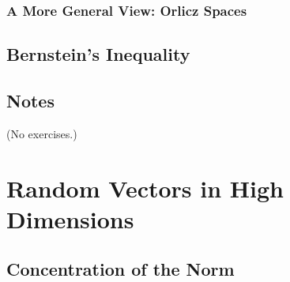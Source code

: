 \documentclass{report}
\theoremstyle{definition}
\newenvironment{exercise}[1]{
  \renewcommand\theexerciseimpl{#1}
  \exerciseimpl
}{\endexerciseimpl}
\begin{document}
\begin{exercise}{2.7.4}
\end{exercise}

\begin{exercise}{2.7.10}
\end{exercise}

\subsection{A More General View: Orlicz Spaces}

\begin{exercise}{2.7.11}
\end{exercise}

\section{Bernstein's Inequality}

\begin{exercise}{2.8.5}
\end{exercise}

\begin{exercise}{2.8.6}
\end{exercise}

\section{Notes}

(No exercises.)


\chapter{Random Vectors in High Dimensions}

\section{Concentration of the Norm}

\begin{exercise}{3.1.4}
\end{exercise}

\begin{exercise}{3.1.5}
\end{exercise}

\begin{exercise}{3.1.6}
\end{exercise}

\begin{exercise}{3.1.7}
\end{exercise}
\end{document}
